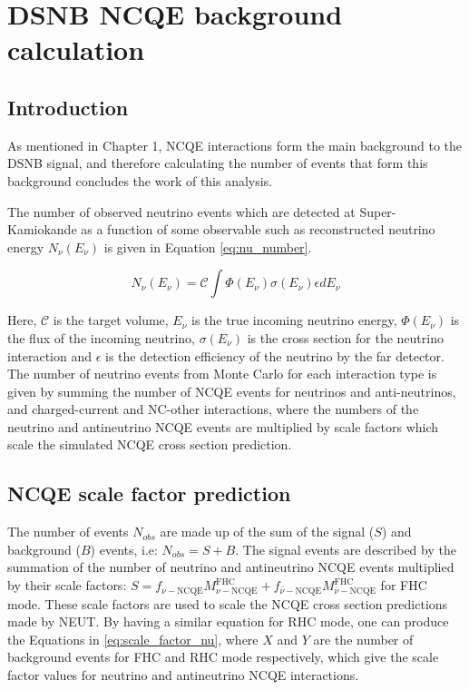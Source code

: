 \chapter{DSNB NCQE background calculation}
\label{chp:ncqe_xsec}


\section{Introduction}

As mentioned in Chapter 1, NCQE interactions form the main background to the DSNB signal, and therefore calculating the number of events that form this background concludes the work of this analysis. 

The number of observed neutrino events which are detected at Super-Kamiokande as a function of some observable such as reconstructed neutrino energy $N_{\nu}(E_{\nu})$ is given in Equation \ref{eq:nu_number}.

\begin{equation}
    N_\nu(E_\nu)=\mathcal{C} \int \Phi\left(E_\nu\right) \sigma\left(E_\nu\right) \epsilon d E_\nu
\label{eq:nu_number}
\end{equation}

Here, $\mathcal{C}$ is the target volume, $E_{\nu}$ is the true incoming neutrino energy, $\Phi(E_{\nu})$ is the flux of the incoming neutrino, $\sigma(E_{\nu})$ is the cross section for the neutrino interaction and $\epsilon$ is the detection efficiency of the neutrino by the far detector. The number of neutrino events from Monte Carlo for each interaction type is given by summing the number of NCQE events for neutrinos and anti-neutrinos, and charged-current and NC-other interactions, where the numbers of the neutrino and antineutrino NCQE events are multiplied by scale factors which scale the simulated NCQE cross section prediction.


\section{NCQE scale factor prediction}


The number of events $N_{obs}$ are made up of the sum of the signal ($S$) and background ($B$) events, i.e: $N_{obs} = S + B$. The signal events are described by the summation of the number of neutrino and antineutrino NCQE events multiplied by their scale factors: $S  = f_{\nu-\mathrm{NCQE}} M_{\nu-\mathrm{NCQE}}^{\mathrm{FHC}}+f_{\bar{\nu}-\mathrm{NCQE}} M_{\bar{\nu}-\mathrm{NCQE}}^{\mathrm{FHC}}$ for FHC mode. These scale factors are used to scale the NCQE cross section predictions made by NEUT. By having a similar equation for RHC mode, one can produce the Equations in \ref{eq:scale_factor_nu}, where $X$ and $Y$ are the number of background events for FHC and RHC mode respectively, which give the scale factor values for neutrino and antineutrino NCQE interactions. 

